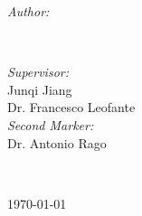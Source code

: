 \begin{titlepage}
\begin{minipage}{0.4\textwidth}
\begin{flushleft} \large
\emph{Author:}\\
\@author %
\end{flushleft}
\end{minipage}
~
\begin{minipage}{0.4\textwidth}
\begin{flushright} \large
\emph{Supervisor:} \\
Junqi Jiang  \\%
Dr. Francesco Leofante  \\[1.2em] %
\emph{Second Marker:} \\
Dr. Antonio Rago %
\end{flushright}
\end{minipage}\\[2cm]
\makeatother



{\large \today}\\[2cm] %

\vfill %

\end{titlepage}